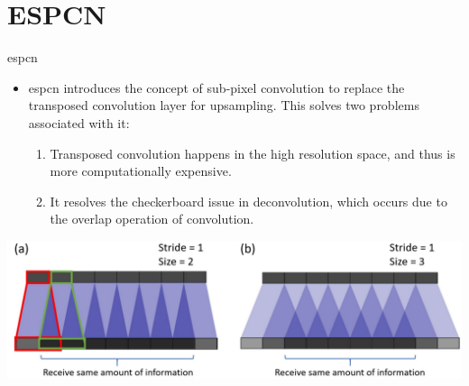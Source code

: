 \documentclass[hyperref={unicode}, xcolor=dvipsnames, t]{beamer}
\begin{document}
\section{ESPCN}
\begin{frame}{\texorpdfstring{\gls{espcn}}{Lg}}
    \begin{itemize}
        \item \gls{espcn} introduces the concept of sub-pixel convolution to replace the transposed convolution layer for upsampling. This solves two problems associated with it:
        \begin{enumerate}
            \item Transposed convolution happens in the high resolution space, and thus is more computationally expensive.
            \item It resolves the checkerboard issue in deconvolution, which occurs due to the overlap operation of convolution.
        \end{enumerate}
    \end{itemize}
    \begin{center}
        \includegraphics[keepaspectratio, height=0.4\textheight]{figures/trans_conv_problem.png}
    \end{center}
\end{frame}
\end{document}

